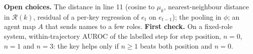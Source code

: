 \documentclass[10pt,a4paper]{article}
\newcommand{\R}{\mathcal{R}}
\begin{document}
\vspace{1pt}
{\scriptsize\textcolor{ourfr}{\textbf{Open choices.} The distance in line 11 (cosine to $\mu_k$, nearest-neighbour distance in $\R(k)$, residual of a per-key regression of $e_t$ on $e_{t-1}$); the pooling in $\phi$; an agent map $A$ that sends names to a few roles. \textbf{First check.} On a fixed-role system, within-trajectory AUROC of the labelled step for step position, $n=0$, $n=1$ and $n=3$: the key helps only if $n\ge1$ beats both position and $n=0$.}\par}
\end{document}
